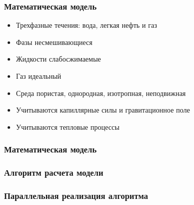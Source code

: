 \documentclass[10pt,pdf,hyperref={unicode}]{beamer} %
\begin{document}
\begin{frame}
\begin{center}
\frametitle{Математическая модель}
\begin{itemize}
\item Трехфазные течения: вода, легкая нефть и газ
\vspace{0.3cm}
\item Фазы несмешивающиеся
\vspace{0.3cm}
\item Жидкости слабосжимаемые
\vspace{0.3cm}
\item Газ идеальный
\vspace{0.3cm}
\item Среда пористая, однородная, изотропная, неподвижная
\vspace{0.3cm}
\item Учитываются капиллярные силы и гравитационное поле
\vspace{0.3cm}
\item Учитываются тепловые процессы
\end{itemize}
\end{center}
\end{frame}

\begin{frame}
\begin{center}
\frametitle{Математическая модель}

\end{center}
\end{frame}

\begin{frame}
\begin{center}
\frametitle{Алгоритм расчета модели}

\end{center}
\end{frame}

\begin{frame}
\begin{center}
\frametitle{Параллельная реализация алгоритма}

\end{center}
\end{frame}
\end{document}
